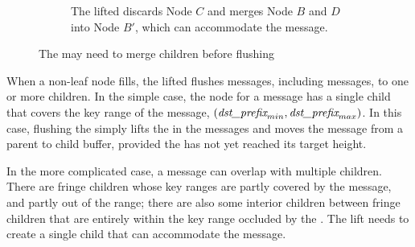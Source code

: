 \begin{figure}
\begin{subfigure}{\textwidth}
        \caption{\label{subfig:flush-2} The lifted \bedag discards Node $C$ and
            merges Node $B$ and $D$ into Node $B'$, which can accommodate the
            \goto message.}
    \end{subfigure}
    \caption[An example of flushing \goto messages merges children]{\label{fig:flush}
        The \bedag may need to merge children before flushing}
\end{figure}

When a non-leaf node fills, the lifted \bedag flushes messages, including \goto
messages, to one or more children.
In the simple case, the node for a \goto message has a single child that covers
the key range of the \goto message, $(\textit{dst\_prefix}_{min}, \textit{dst\_prefix}_{max})$.
In this case, flushing the \goto simply lifts the \dpre in the messages and
moves the message from a parent to child buffer,
provided the \goto has not yet reached its target height.

In the more complicated case, a \goto message can overlap with multiple
children.
There are fringe children whose key ranges are partly covered by the \goto
message, and partly out of the \goto range;
there are also some interior children between fringe children that are entirely
within the key range occluded by the \goto.
The lift \bedag needs to create a single child that can accommodate the \goto
message.

